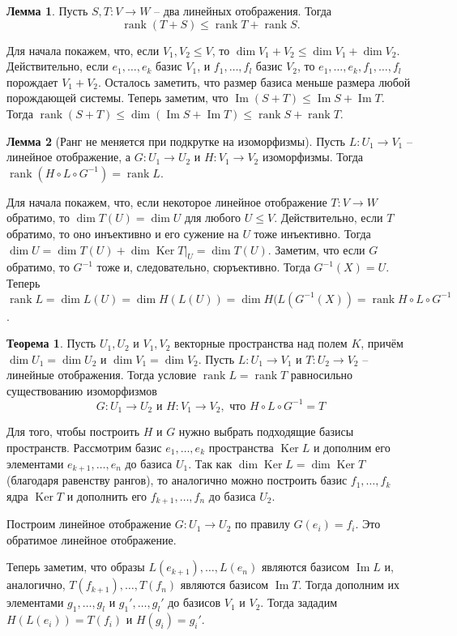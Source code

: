 \documentclass[10pt,a4paper,oneside]{book} %
\theoremstyle{definition}
\newtheorem{thm}{Теорема}
\newtheorem{lem}{Лемма}
\newcommand{\rank}{\operatorname{rank}}
\DeclareMathOperator{\Ker}{Ker}
\newcommand{\im}{\operatorname{Im}}
\def\thrm{\begin{thm}}
\def\ethrm{\end{thm}}
\def\lm{\begin{lem}}
\def\elm{\end{lem}}
\begin{document}
\lm Пусть $S, T \colon V \to W$ -- два линейных отображения. Тогда $$\rank (T + S) \leq \rank T + \rank S.$$
\elm
\proof Для начала покажем, что, если $V_1,V_2 \leq V$, то $\dim V_1 +V_2 \leq \dim V_1 + \dim V_2$. Действительно, если $e_1,\dots, e_k$ базис  $V_1$, и $f_1,\dots, f_l$ базис $V_2$, то $e_1,\dots, e_k, f_1, \dots, f_l$ порождает $V_1+V_2$. Осталось заметить, что размер базиса меньше размера любой порождающей системы.
Теперь заметим, что $\im (S+T) \leq \im S + \im T$. Тогда $\rank (S+T) \leq \dim (\im S + \im T) \leq \rank S + \rank T$.
\endproof

\lm[Ранг не меняется при подкрутке на изоморфизмы] Пусть $L \colon U_1 \to V_1$ -- линейное отображение, а $G \colon U_1 \to U_2 $ и $H \colon V_1 \to V_2$ изоморфизмы. Тогда $\rank (H \circ L \circ G^{-1}) = \rank L$.
\elm
\proof Для начала покажем, что, если некоторое линейное отображение $T\colon V \to W$ обратимо, то  $\dim T(U)= \dim U$ для любого $U \leq V$. Действительно, если $T$ обратимо, то оно инъективно и его сужение на $U$ тоже инъективно. Тогда $\dim U = \dim T(U) + \dim \Ker T|_U= \dim T(U)$.
Заметим, что если $G$ обратимо, то  $G^{-1}$ тоже и, следовательно, сюръективно. Тогда $G^{-1}(X)=U$.  Теперь $\rank L= \dim L(U)= \dim H(L(U))= \dim H(L(G^{-1}(X))= \rank H \circ L \circ G^{-1}$.
\endproof

\thrm Пусть $U_1, U_2$ и $V_1,V_2$ векторные пространства над полем $K$, причём  $\dim U_1=\dim U_2$ и $\dim V_1 =\dim V_2$. Пусть $L \colon U_1\to V_1$ и $T \colon U_2 \to V_2$ -- линейные отображения. Тогда условие $\rank L=\rank T$ равносильно существованию изоморфизмов
$$G \colon U_1 \to U_2 \text{ и }  H \colon V_1 \to V_2, \text{ что }  H \circ L \circ G^{-1}=T$$
\ethrm
\proof Для того, чтобы построить $H$ и $G$ нужно выбрать подходящие базисы пространств. Рассмотрим базис $e_1,\dots, e_k$ пространства $\Ker L$ и дополним его элементами $e_{k+1},\dots, e_n$ до базиса $U_1$. Так как $\dim \Ker L = \dim \Ker T$ (благодаря равенству рангов), то аналогично можно построить базис $f_1,\dots, f_k$ ядра $\Ker T$ и дополнить его $f_{k+1},\dots, f_n$ до базиса $U_2$.

Построим линейное отображение $G\colon U_1 \to U_2$ по правилу $G(e_i)=f_i$. Это обратимое линейное отображение.

Теперь заметим, что образы $L(e_{k+1}), \dots, L(e_n)$ являются базисом $\im L$ и, аналогично, $T(f_{k+1}), \dots, T(f_n)$  являются базисом $\im T$. Тогда дополним их элементами $g_1,\dots,g_l$ и $ g_1',\dots, g_l'$ до базисов $V_1$ и $V_2$. Тогда  зададим $H(L(e_i))=T(f_i)$ и $H(g_i)=g_i'$.
\end{document}
